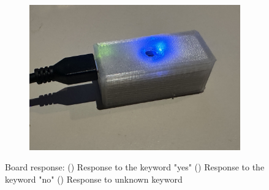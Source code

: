 \begin{figure}[h!]
\begin{subfigure}{0.3\textwidth}
		\includegraphics[width=\linewidth]{Images/Results/ArduinoBlue}
		\caption{}    %
		\label{subfig:ArduinoBlue}
	\end{subfigure}
	
	\caption{Board response: () Response to the keyword "yes" () Response to the keyword "no" () Response to unknown keyword}
	\label{fig:ArduinoImages}
\end{figure}







